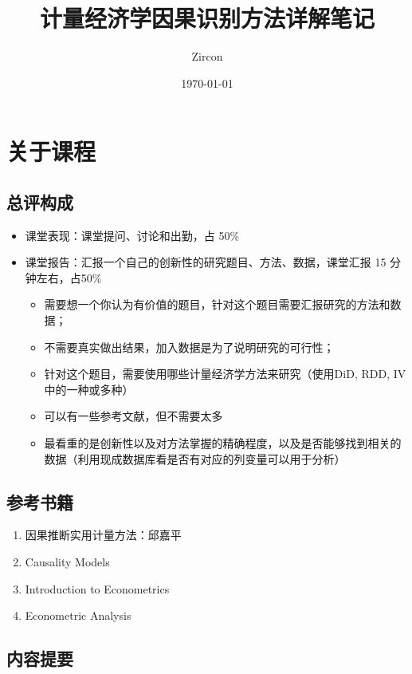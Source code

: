 \documentclass[11pt,a4paper]{ctexart}
\title{计量经济学因果识别方法详解笔记}
\author{Zircon}
\date{\today}
\begin{document}
\maketitle
\tableofcontents
\newpage

\section{关于课程}

\subsection{总评构成}

\begin{itemize}
\item
  课堂表现：课堂提问、讨论和出勤，占 50\%
\item
  课堂报告：汇报一个自己的创新性的研究题目、方法、数据，课堂汇报 15
  分钟左右，占50\%

  \begin{itemize}
  \item
    需要想一个你认为有价值的题目，针对这个题目需要汇报研究的方法和数据；
  \item
    不需要真实做出结果，加入数据是为了说明研究的可行性；
  \item
    针对这个题目，需要使用哪些计量经济学方法来研究（使用DiD, RDD,
    IV中的一种或多种）
  \item
    可以有一些参考文献，但不需要太多
  \item
    最看重的是创新性以及对方法掌握的精确程度，以及是否能够找到相关的数据（利用现成数据库看是否有对应的列变量可以用于分析）
  \end{itemize}
\end{itemize}

\subsection{参考书籍}

\begin{enumerate}
\def\labelenumi{\arabic{enumi}.}
\item
  因果推断实用计量方法：邱嘉平
\item
  Causality Models
\item
  Introduction to Econometrics
\item
  Econometric Analysis
\end{enumerate}

\subsection{内容提要}
\end{document}
